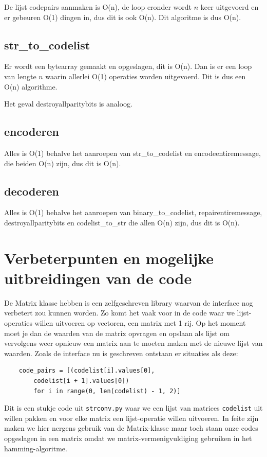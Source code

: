 \documentclass[a4paper]{article}
\begin{document}
De lijst codepairs aanmaken is O(n), de loop eronder wordt $n$ keer uitgevoerd en er gebeuren O(1) dingen in, dus dit is ook O(n). Dit algoritme is dus O(n).

\subsection{str\_to\_codelist}

Er wordt een bytearray gemaakt en opgeslagen, dit is O(n). Dan is er een loop van lengte $n$ waarin allerlei O(1) operaties worden uitgevoerd. Dit is dus een O(n) algorithme. 


Het geval destroyallparitybits is analoog.

\subsection{encoderen}

Alles is O(1) behalve het aanroepen van str\_to\_codelist en encodeentiremessage, die beiden O(n) zijn, dus dit is O(n).

\subsection{decoderen}

Alles is O(1) behalve het aanroepen van binary\_to\_codelist, repairentiremessage, destroyallparitybits en codelist\_to\_str die allen O(n) zijn, dus dit is O(n).

\section{Verbeterpunten en mogelijke uitbreidingen van de code}
De Matrix klasse hebben is een zelfgeschreven library waarvan de interface nog verbetert zou kunnen worden. Zo komt het vaak voor in de code waar we lijst-operaties willen uitvoeren op vectoren, een matrix met 1 rij. Op het moment moet je dan de waarden van de matrix opvragen en opslaan als lijst om vervolgens weer opnieuw een matrix aan te moeten maken met de nieuwe lijst van waarden. Zoals de interface nu is geschreven ontstaan er situaties als deze:
\begin{lstlisting}
	code_pairs = [(codelist[i].values[0], 
		codelist[i + 1].values[0]) 
		for i in range(0, len(codelist) - 1, 2)]
\end{lstlisting}
Dit is een stukje code uit \texttt{strconv.py} waar we een lijst van matrices \texttt{codelist} uit willen pakken en voor elke matrix een lijst-operatie willen uitvoeren. In feite zijn maken we hier nergens gebruik van de Matrix-klasse maar toch staan onze codes opgeslagen in een matrix omdat we matrix-vermenigvuldiging gebruiken in het hamming-algoritme.
\end{document}
